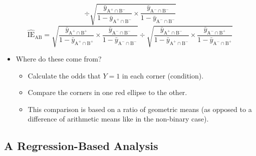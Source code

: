 \begin{itemize}
\[                  \div \sqrt{\frac{\bar{y}_{\text{A}^+\cap \text{B}^-}}{1-\bar{y}_{\text{A}^+\cap \text{B}^-}}\times\frac{\bar{y}_{\text{A}^-\cap \text{B}^-}}{1-\bar{y}_{\text{A}^-\cap \text{B}^-}}} \]
            \[ \widehat{\text{IE}}_{\text{AB}}=\sqrt{\frac{\bar{y}_{\text{A}^+\cap \text{B}^+}}{1-\bar{y}_{\text{A}^+\cap \text{B}^+}}\times\frac{\bar{y}_{\text{A}^-\cap \text{B}^-}}{1-\bar{y}_{\text{A}^-\cap \text{B}^-}}}
                  \div \sqrt{\frac{\bar{y}_{\text{A}^+\cap \text{B}^-}}{1-\bar{y}_{\text{A}^+\cap \text{B}^-}}\times\frac{\bar{y}_{\text{A}^-\cap \text{B}^+}}{1-\bar{y}_{\text{A}^-\cap \text{B}^+}}} \]
            \begin{itemize}[$\hookrightarrow$]
                  \item Where do these come from?
                        \begin{itemize}
                              \item Calculate the odds that $ Y=1 $ in each corner (condition).
                              \item Compare the corners in one red ellipse to the other.
                              \item This comparison is based on a ratio of geometric means (as opposed to a difference of arithmetic means like in the non-binary case).
                        \end{itemize}
            \end{itemize}
\end{itemize}
\subsection{A Regression-Based Analysis}
